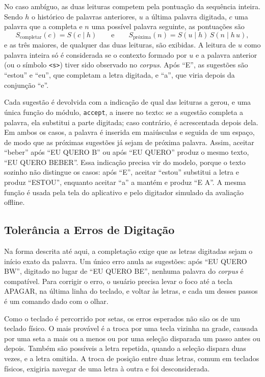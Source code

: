 No caso ambíguo, as duas leituras competem pela pontuação da sequência inteira. Sendo $h$ o histórico de palavras anteriores, $u$ a última palavra digitada, $c$ uma palavra que a completa e $n$ uma possível palavra seguinte, as pontuações são
\begin{equation}
    S_{\textrm{completar}}(c) = S(c \mid h) \qquad \textrm{e} \qquad S_{\textrm{próxima}}(n) = S(u \mid h)\,S(n \mid h\,u),
    \label{eq:ambiguidade}
\end{equation}
e as três maiores, de qualquer das duas leituras, são exibidas. A leitura de $u$ como palavra inteira só é considerada se o contexto formado por $u$ e a palavra anterior (ou o símbolo \texttt{<s>}) tiver sido observado no \textit{corpus}. Após ``E'', as sugestões são ``estou'' e ``eu'', que completam a letra digitada, e ``a'', que viria depois da conjunção ``e''.

Cada sugestão é devolvida com a indicação de qual das leituras a gerou, e uma única função do módulo, \texttt{accept}, a insere no texto: se a sugestão completa a palavra, ela substitui a parte digitada; caso contrário, é acrescentada depois dela. Em ambos os casos, a palavra é inserida em maiúsculas e seguida de um espaço, de modo que as próximas sugestões já sejam de próxima palavra. Assim, aceitar ``beber'' após ``EU QUERO B'' ou após ``EU QUERO'' produz o mesmo texto, ``EU QUERO BEBER''. Essa indicação precisa vir do modelo, porque o texto sozinho não distingue os casos: após ``E'', aceitar ``estou'' substitui a letra e produz ``ESTOU'', enquanto aceitar ``a'' a mantém e produz ``E A''. A mesma função é usada pela tela do aplicativo e pelo digitador simulado da avaliação offline.

\subsection{Tolerância a Erros de Digitação} \label{sec:met_tolerancia}

Na forma descrita até aqui, a completação exige que as letras digitadas sejam o início exato da palavra. Um único erro anula as sugestões: após ``EU QUERO BW'', digitado no lugar de ``EU QUERO BE'', nenhuma palavra do \textit{corpus} é compatível. Para corrigir o erro, o usuário precisa levar o foco até a tecla APAGAR, na última linha do teclado, e voltar às letras, e cada um desses passos é um comando dado com o olhar.

Como o teclado é percorrido por setas, os erros esperados não são os de um teclado físico. O mais provável é a troca por uma tecla vizinha na grade, causada por uma seta a mais ou a menos ou por uma seleção disparada um passo antes ou depois. Também são possíveis a letra repetida, quando a seleção dispara duas vezes, e a letra omitida. A troca de posição entre duas letras, comum em teclados físicos, exigiria navegar de uma letra à outra e foi desconsiderada.

